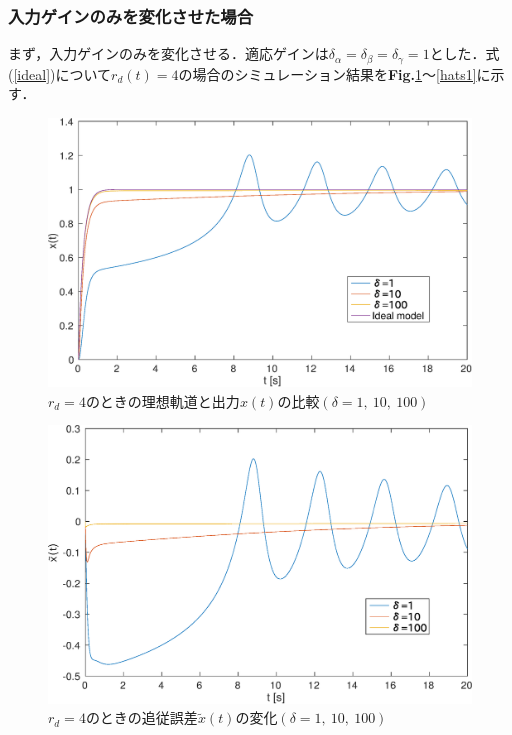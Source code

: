 \documentclass[a4paper,12pt]{jarticle}
\begin{document}
\subsubsection{入力ゲインのみを変化させた場合}
まず，入力ゲインのみを変化させる．適応ゲインは$ \delta_{\alpha} = \delta_{\beta} = \delta_{\gamma} = 1 $とした．式({\ref{ideal}})について$ r_d(t) = 4 $の場合のシミュレーション結果を{\bf Fig.}{\ref{x1}}〜{\ref{hats1}}に示す．
\begin{figure}[H]
 \begin{center}
  \includegraphics[scale=0.485]{../figure/eps/input/1/x.eps}
  \caption{$ r_d = 4 $のときの理想軌道と出力$ x(t) $の比較$(\delta = 1, ~ 10, ~ 100 )$}
  \label{x1}
 \end{center}
\end{figure}
\begin{figure}[H]
 \begin{center}
  \includegraphics[scale=0.5]{../figure/eps/input/1/tilde_x.eps}
  \caption{$ r_d = 4 $のときの追従誤差$ \tilde{x}(t) $の変化$(\delta = 1, ~ 10, ~ 100 )$}
  \label{tilde_x1}
 \end{center}
\end{figure}
\end{document}
